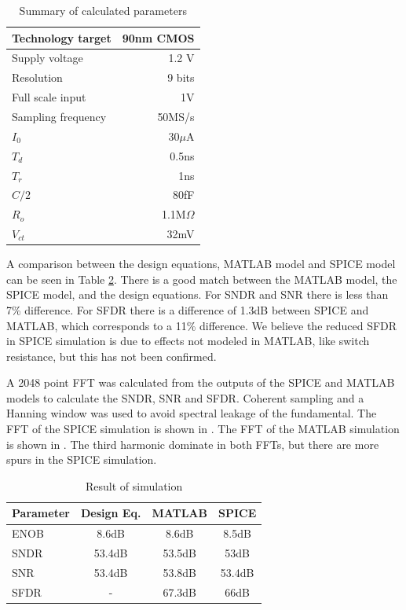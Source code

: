 \begin{table}[htbp]
\centering
\renewcommand{\arraystretch}{1.3}
\caption{ Summary of calculated parameters  }
\label{cdestab:params}
\begin{tabular}{l|r}
Technology target & 90nm CMOS\\
\hline
Supply voltage & 1.2 V\\
\hline
Resolution & 9 bits \\
\hline
Full scale input & 1V \\
\hline
Sampling frequency & 50MS/s\\
\hline
$I_0$ & 30$\mu$A\\
\hline
$T_d$ & 0.5ns\\
\hline
$T_r$ & 1ns\\
\hline
$C/2$ & 80fF\\
\hline
$R_o$ & 1.1M$\Omega$\\
\hline
$V_{ct}$ & 32mV \\
\end{tabular} 
\end{table}

A comparison between
the design equations, MATLAB model and SPICE model can be seen in
Table \ref{cdestab:res}. 
There is a good match between the MATLAB model, the SPICE model, and the
design equations. For SNDR and SNR there is less than 7\%
difference. For SFDR there is a difference of 1.3dB between SPICE and
MATLAB, which corresponds to a 11\% difference. We believe the reduced
SFDR in SPICE simulation is due to effects not modeled in MATLAB, like
switch resistance, but this has not been confirmed. 

A 2048 point FFT was calculated from the outputs of
the SPICE and MATLAB models to calculate the SNDR, SNR and
SFDR. Coherent sampling and a Hanning window was used to avoid
spectral leakage of the fundamental. The FFT of the SPICE simulation is shown in
. The FFT of the MATLAB simulation is shown in
. 
The third harmonic dominate in both FFTs, but there are more spurs in
the SPICE simulation. 


\begin{table}[htbp]
\centering
\renewcommand{\arraystretch}{1.3}
\caption{ Result of simulation }
\label{cdestab:res}
\begin{tabular}{l|c|c|c}

Parameter & Design Eq. & MATLAB & SPICE \\
\hline
\hline
ENOB & 8.6dB &  8.6dB &  8.5dB \\
SNDR & 53.4dB & 53.5dB & 53dB \\
SNR  & 53.4dB & 53.8dB & 53.4dB \\
SFDR & -  & 67.3dB &66dB  \\

\end{tabular} 
\end{table}


